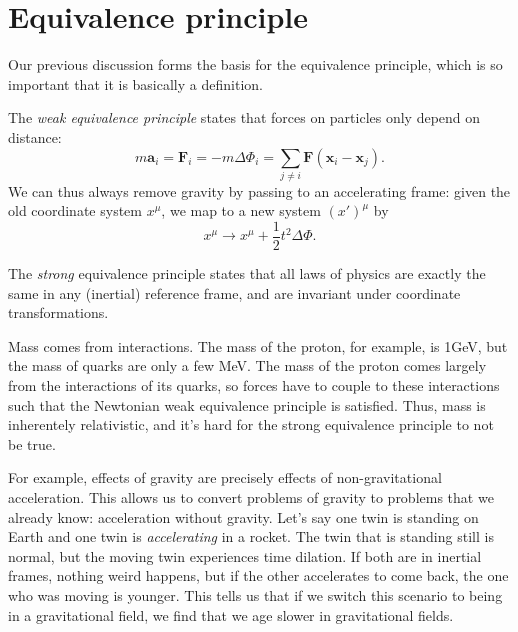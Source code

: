 \chapter{Equivalence principle}

Our previous discussion forms the basis for the equivalence principle, which is so important that it is basically a definition.

\begin{definition}\label{alsjnsdl}
	The \emph{weak equivalence principle} states that forces on particles only depend on distance:
	\[
		m \mathbf{a} _i = \mathbf{F} _i = -m \Delta \Phi_i = \sum_{j\neq i} \mathbf{F} ( \mathbf{x} _i - \mathbf{x} _j)
	.\]
	We can thus always remove gravity by passing to an accelerating frame: given the old coordinate system $x^\mu $, we map to a new system $(x')^\mu $ by
	\[
		x^\mu \to x^\mu +\frac{1}{2} t^2\Delta \Phi 
	.\]

	The \emph{strong} equivalence principle states that all laws of physics are exactly the same in any (inertial) reference frame, and are invariant under coordinate transformations.
\end{definition}

Mass comes from interactions. The mass of the proton, for example, is 1GeV, but the mass of quarks are only a few MeV. The mass of the proton comes largely from the interactions of its quarks, so forces have to couple to these interactions such that the Newtonian weak equivalence principle is satisfied. Thus, mass is inherentely relativistic, and it's hard for the strong equivalence principle to not be true.

For example, effects of gravity are precisely effects of non-gravitational acceleration. This allows us to convert problems of gravity to problems that we already know: acceleration without gravity. Let's say one twin is standing on Earth and one twin is \emph{accelerating} in a rocket. The twin that is standing still is normal, but the moving twin experiences time dilation. If both are in inertial frames, nothing weird happens, but if the other accelerates to come back, the one who was moving is younger. This tells us that if we switch this scenario to being in a gravitational field, we find that we age slower in gravitational fields.
